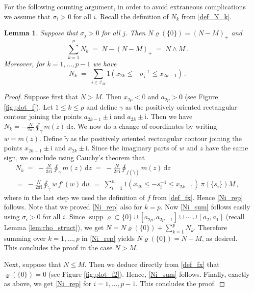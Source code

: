 \documentclass[11pt]{article} %
\numberwithin{equation}{section}
\numberwithin{figure}{section}
\theoremstyle{plain} %
\newtheorem{lemma}[theorem]{Lemma}
\theoremstyle{definition} %
\newcommand{\f}[1]{\boldsymbol{\mathrm{#1}}} %
\renewcommand{\cal}{\mathcal}
\newcommand{\ii}{\mathrm{i}}
\newcommand{\dd}{\mathrm{d}}
\renewcommand{\leq}{\leqslant}
\newcommand{\ind}[1]{\f 1 (#1)}
\DeclareMathOperator{\supp}{supp}
\begin{document}
For the following counting argument, in order to avoid extraneous complications we assume that $\sigma_i > 0$ for all $i$. Recall the definition of $N_k$ from \eqref{def_N_k}.

\begin{lemma} \label{lem:N_i}
Suppose that $\sigma_j > 0$ for all $j$.
Then $N \varrho(\{0\}) = (N-M)_+$ and
\begin{equation} \label{Ni_sum}
\sum_{k = 1}^p N_k \;=\; N - (N - M)_+ \;=\; N \wedge M\,.
\end{equation}
Moreover, for $k = 1, \dots, p - 1$ we have
\begin{equation} \label{Ni_rep}
N_k \;=\; \sum_{i \in \cal I_M} \ind{x_{2 k} \leq - \sigma_i^{-1} \leq x_{2k - 1}}\,.
\end{equation}
\end{lemma}

\begin{proof}
Suppose first that $N > M$. Then $x_{2p} < 0$ and $a_{2p} > 0$ (see Figure \ref{fig:plot_f}). Let $1 \leq k \leq p$ and define $\gamma$ as the positively oriented rectangular contour joining the points $a_{2k - 1} \pm \ii$ and $a_{2k} \pm \ii$. Then we have $N_k = - \frac{N}{2 \pi \ii} \oint_{\gamma} m(z) \, \dd z$. We now do a change of coordinates by writing $w = m(z)$. Define $\tilde \gamma$ as the positively oriented rectangular contour joining the points $x_{2k - 1} \pm \ii$ and $x_{2k} \pm \ii$. Since the imaginary parts of $w$ and $z$ have the same sign, we conclude using Cauchy's theorem that
\begin{multline*}
N_k \;=\; - \frac{N}{2 \pi \ii} \oint_{\gamma} m(z) \, \dd z \;=\; -\frac{N}{2 \pi \ii} \oint_{f(\tilde \gamma)} m(z) \, \dd z
\\
=\; - \frac{N}{2 \pi \ii} \oint_{\tilde \gamma} w \, f'(w) \, \dd w \;=\; \sum_{i = 1}^n \ind{x_{2 k} \leq - s_i^{-1} \leq x_{2k - 1}} \, \pi (\{s_i\}) M\,,
\end{multline*}
where in the last step we used the definition of $f$ from \eqref{def_fx}. Hence \eqref{Ni_rep} follows. Note that we proved \eqref{Ni_rep} also for $k = p$. Now \eqref{Ni_sum} follows easily using $\sigma_i > 0$ for all $i$. Since $\supp \varrho \subset \{0\} \cup [a_{2p}, a_{2p - 1}] \cup \cdots \cup [a_2,a_1]$ (recall Lemma \ref{lem:rho_struct}), we get $N = N \varrho(\{0\}) + \sum_{k = 1}^p N_k$. Therefore summing over $k = 1, \dots, p$ in \eqref{Ni_rep} yields $N \varrho(\{0\}) = N - M$, as desired. This concludes the proof in the case $N > M$.

Next, suppose that $N \leq M$. Then we deduce directly from \eqref{def_fx} that $\varrho(\{0\}) = 0$ (see Figure \ref{fig:plot_f2}). Hence, \eqref{Ni_sum} follows. Finally, exactly as above, we get \eqref{Ni_rep} for $i = 1, \dots, p-1$. This concludes the proof.
\end{proof}
\end{document}

